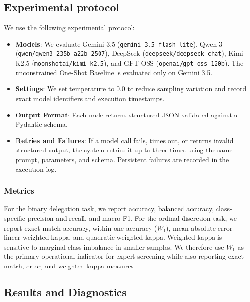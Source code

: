 \documentclass[runningheads]{llncs}
\begin{document}
\subsection{Experimental protocol}

We use the following experimental protocol:
\begin{itemize}[nosep]
    \raggedright
    \item \textbf{Models}: We evaluate Gemini 3.5 (\texttt{gemini-3.5-flash-lite}), Qwen 3 (\texttt{qwen/qwen3-235b-a22b-2507}), DeepSeek (\texttt{deepseek/deepseek-chat}), Kimi K2.5 (\texttt{moonshotai/kimi-k2.5}), and GPT-OSS (\texttt{openai/gpt-oss-120b}). The unconstrained One-Shot Baseline is evaluated only on Gemini 3.5.
    
    \item \textbf{Settings}: We set temperature to 0.0 to reduce sampling variation and record exact model identifiers and execution timestamps.
    
    \item \textbf{Output Format}: Each node returns structured JSON validated against a Pydantic schema.
    
    \item \textbf{Retries and Failures}: If a model call fails, times out, or returns invalid structured output, the system retries it up to three times using the same prompt, parameters, and schema. Persistent failures are recorded in the execution log.
\end{itemize}


\vspace{-0.2cm}
\subsubsection{Metrics}

For the binary delegation task, we report accuracy, balanced accuracy, class-specific precision and recall, and macro-F1. For the ordinal discretion task, we report exact-match accuracy, within-one accuracy ($W_1$), mean absolute error, linear weighted kappa, and quadratic weighted kappa. Weighted kappa is sensitive to marginal class imbalance in smaller samples. We therefore use $W_1$ as the primary operational indicator for expert screening while also reporting exact match, error, and weighted-kappa measures.

\vspace{-0.3 cm}
\subsection{Results and Diagnostics}
\vspace{-0.2 cm}
\end{document}
